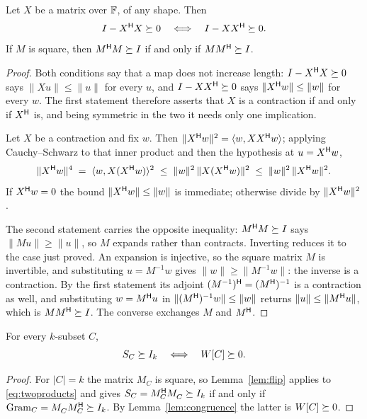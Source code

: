 \begin{lemma}[Lean]\label{lem:flip}
Let $X$ be a matrix over $\mathbb{F}$, of any shape.  Then
\[
  I-X^{\mathsf{H}} X\succeq0
  \quad\Longleftrightarrow\quad
  I-XX^{\mathsf{H}}\succeq0 .
\]
If $M$ is square, then $M^{\mathsf{H}} M\succeq I$ if and only if $MM^{\mathsf{H}}\succeq I$.
\end{lemma}

\begin{proof}
Both conditions say that a map does not increase length: $I-X^{\mathsf{H}} X\succeq0$
says $\lVert Xu\rVert\le\lVert u\rVert$ for every $u$, and $I-XX^{\mathsf{H}}\succeq0$
says $\lVert X^{\mathsf{H}} w\rVert\le\lVert w\rVert$ for every $w$.  The first
statement therefore asserts that $X$ is a contraction if and only if
$X^{\mathsf{H}}$ is, and being symmetric in the two it needs only one implication.

Let $X$ be a contraction and fix $w$.  Then
$\lVert X^{\mathsf{H}} w\rVert^{2}=\langle w,XX^{\mathsf{H}} w\rangle$; applying
Cauchy--Schwarz to that inner product and then the hypothesis at
$u=X^{\mathsf{H}} w$,
\[
  \lVert X^{\mathsf{H}} w\rVert^4
  \;=\;\langle w,X(X^{\mathsf{H}} w)\rangle^2
  \;\le\;\lVert w\rVert^2\,\lVert X(X^{\mathsf{H}} w)\rVert^2
  \;\le\;\lVert w\rVert^2\,\lVert X^{\mathsf{H}} w\rVert^2 .
\]
If $X^{\mathsf{H}} w=0$ the bound $\lVert X^{\mathsf{H}} w\rVert\le\lVert w\rVert$ is
immediate; otherwise divide by $\lVert X^{\mathsf{H}} w\rVert^{2}$.

The second statement carries the opposite inequality: $M^{\mathsf{H}} M\succeq I$ says
$\lVert Mu\rVert\ge\lVert u\rVert$, so $M$ expands rather than contracts.
Inverting reduces it to the case just proved.  An expansion is injective,
so the square matrix $M$ is invertible, and substituting $u=M^{-1}w$ gives
$\lVert w\rVert\ge\lVert M^{-1}w\rVert$: the inverse is a contraction.  By
the first statement its adjoint $(M^{-1})^{\mathsf{H}}=(M^{\mathsf{H}})^{-1}$ is a
contraction as well, and
substituting $w=M^{\mathsf{H}} u$ in
$\lVert (M^{\mathsf{H}})^{-1}w\rVert\le\lVert w\rVert$ returns
$\lVert u\rVert\le\lVert M^{\mathsf{H}} u\rVert$, which is $MM^{\mathsf{H}}\succeq I$.  The
converse exchanges $M$ and $M^{\mathsf{H}}$.
\end{proof}

\begin{lemma}[Lean]\label{lem:chart}
For every $k$-subset $C$,
\[
  S_{C}\succeq I_k \quad\Longleftrightarrow\quad W[C]\succeq 0 .
\]
\end{lemma}

\begin{proof}
For $\lvert C\rvert=k$ the matrix $M_C$ is square, so
Lemma~\ref{lem:flip} applies to \eqref{eq:twoproducts} and gives
$\SC=M_C\adj M_C^{\vphantom{\mathsf{H}}}\psd I_k$ if and only if
$\Gram_C=M_C^{\vphantom{\mathsf{H}}}M_C\adj\psd I_k$.  By
Lemma~\ref{lem:congruence} the latter is $W[C]\succeq0$.
\end{proof}

